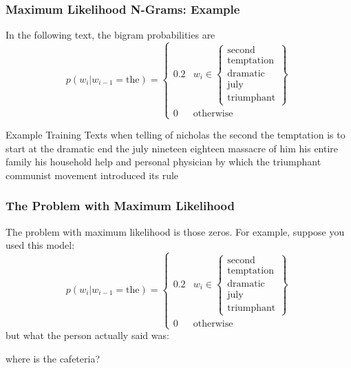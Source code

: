 \documentclass{beamer}
\begin{document}
\begin{frame}
  \frametitle{Maximum Likelihood N-Grams: Example}

  In the following text, the bigram probabilities are
  \begin{displaymath}
    p(w_i|w_{i-1}=\mbox{the})=
    \begin{cases}
      0.2 & w_i\in\left\{\begin{array}{c}\mbox{second}\\\mbox{temptation}\\\mbox{dramatic}\\\mbox{july}\\\mbox{triumphant}\end{array}\right\}\\
      0 & \mbox{otherwise}
    \end{cases}
  \end{displaymath}
  \begin{block}{Example Training Texts}
    when telling of nicholas the second the
    temptation is to start at the dramatic end the july nineteen eighteen
    massacre of him his entire family his household help and personal
    physician by which the triumphant communist movement introduced its
    rule
  \end{block}
\end{frame}

\begin{frame}
  \frametitle{The Problem with Maximum Likelihood}

  The problem with maximum likelihood is those zeros.  For example,
  suppose you used this model:
  \begin{displaymath}
    p(w_i|w_{i-1}=\mbox{the})=
    \begin{cases}
      0.2 & w_i\in\left\{\begin{array}{c}\mbox{second}\\\mbox{temptation}\\\mbox{dramatic}\\\mbox{july}\\\mbox{triumphant}\end{array}\right\}\\
      0 & \mbox{otherwise}
    \end{cases}
  \end{displaymath}
  but what the person actually said was:
  \begin{block}{}
    where is the cafeteria?
  \end{block}
\end{frame}
\end{document}
